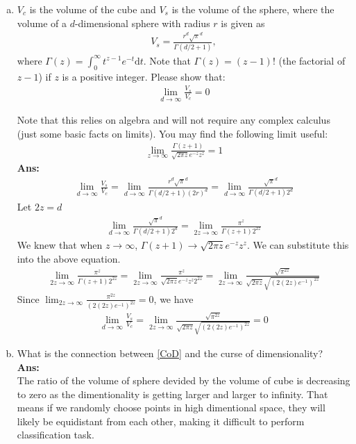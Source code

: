 \documentclass[11pt]{article}
\begin{document}
\begin{enumerate}[(a)]
\item $V_c$ is the volume of the cube and $V_s$ is the volume of the sphere, where the volume of a $d$-dimensional sphere with radius $r$ is given as 
\begin{eqnarray}
V_s = \frac{r^d\sqrt{\pi}^d}{\Gamma(d/2+1)}, \nonumber
\end{eqnarray}
where $\Gamma(z)=\int_0^{\infty}t^{z-1}e^{-t}\textrm{d}t$.  Note that $\Gamma(z) = (z-1)!$ (the factorial of $z-1$) if $z$ is a positive integer.  Please show that: 
\begin{eqnarray}
\lim_{d\rightarrow\infty}\frac{V_s}{V_c} = 0
\label{CoD}
\end{eqnarray}

Note that this relies on algebra and will not require any complex calculus (just some basic facts on limits). You may find the following limit useful:
\begin{eqnarray}
\lim_{z\rightarrow\infty}\frac{\Gamma(z+1)}{\sqrt{2\pi z}e^{-z}z^z}=1 \nonumber
\end{eqnarray}
\textbf{Ans:}\\
\begin{eqnarray}
\lim_{d\rightarrow\infty}\frac{V_s}{V_c} = 
\lim_{d \rightarrow\infty}\frac{r^d\sqrt{\pi}^d}{\Gamma(d/2+1)(2r)^d} =
\lim_{d \rightarrow\infty}\frac{\sqrt{\pi}^d}{\Gamma(d/2+1)2^d} \nonumber
\end{eqnarray}
Let $2z = d$
\begin{eqnarray}
\lim_{d \rightarrow\infty}\frac{\sqrt{\pi}^d}{\Gamma(d/2+1)2^d} = 
\lim_{2z \rightarrow\infty}\frac{\pi^z}{\Gamma(z+1)2^{2z}} \nonumber
\end{eqnarray}
We knew that when $z \rightarrow \infty$, $\Gamma(z+1) \rightarrow \sqrt{2\pi z}e^{-z}z^z$. We can substitute this into the above equation. 
\begin{eqnarray}
\lim_{2z \rightarrow\infty}\frac{\pi^z}{\Gamma(z+1)2^{2z}} = 
\lim_{2z \rightarrow\infty}\frac{\pi^z}{\sqrt{2\pi z}e^{-z}z^z2^{2z}} = 
\lim_{2z \rightarrow\infty}\frac{\sqrt{\pi^{2z}}}{\sqrt{2\pi z}\sqrt{(2(2z)e^{-1})^{2z}}}
\nonumber
\end{eqnarray}
Since $\lim_{2z\rightarrow \infty} \frac{\pi^{2z}}{(2(2z)e^{-1})^{2z}}=0$, we have
\begin{eqnarray}
\lim_{d\rightarrow\infty}\frac{V_s}{V_c} =
\lim_{2z \rightarrow\infty}\frac{\sqrt{\pi^{2z}}}{\sqrt{2\pi z}\sqrt{(2(2z)e^{-1})^{2z}}} = 0
\nonumber
\end{eqnarray}

\item What is the connection between \eqref{CoD} and the curse of dimensionality?\\
\textbf{Ans:}\\
The ratio of the volume of sphere devided by the volume of cube is decreasing to zero as the dimentionality is getting larger and larger to infinity. That means if we randomly choose points in high dimentional space, they will likely be equidistant from each other, making it difficult to perform classification task.
\end{enumerate}
\end{document}
